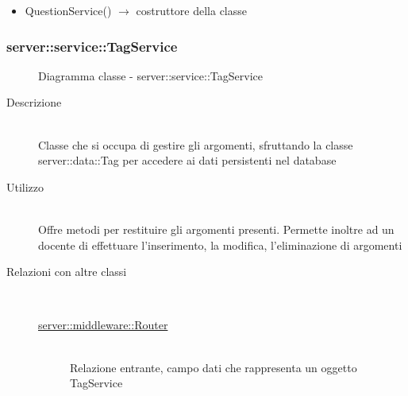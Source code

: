\begin{description}
\begin{itemize}
	\item QuestionService() $\rightarrow$ costruttore della classe
\end{itemize}

\end{description}

\vspace{0.5cm}
\hypertarget{server::service::TagService}{}
\subsubsection[TagService]{server::service::TagService}
\begin{figure}[H]
	\centering
	\caption{Diagramma classe - server::service::TagService}
\end{figure}\begin{description}
\item[Descrizione] \hfill \\
Classe che si occupa di gestire gli argomenti, sfruttando la classe server::data::Tag per accedere ai dati persistenti nel database
\item[Utilizzo] \hfill \\
Offre metodi per restituire gli argomenti presenti. Permette inoltre ad un docente di effettuare l'inserimento, la modifica, l'eliminazione di argomenti
\item[Relazioni con altre classi] \hfill \\
\vspace{-7mm}
\begin{description}
	\item[\hyperlink{server::middleware::Router}{server::middleware::Router}] \hfill \\
	Relazione entrante, campo dati che rappresenta un oggetto TagService
\end{description}


\end{description}
